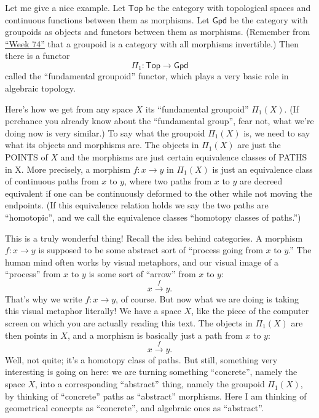 \documentclass{article}
\begin{document}
Let me give a nice example. Let \(\mathsf{Top}\) be the category with
topological spaces and continuous functions between them as morphisms.
Let \(\mathsf{Gpd}\) be the category with groupoids as objects and
functors between them as morphisms. (Remember from
\protect\hyperlink{week74}{``Week 74''} that a groupoid is a category
with all morphisms invertible.) Then there is a functor
\[\Pi_1\colon\mathsf{Top}\to\mathsf{Gpd}\] called the ``fundamental
groupoid'' functor, which plays a very basic role in algebraic topology.

Here's how we get from any space \(X\) its ``fundamental groupoid''
\(\Pi_1(X)\). (If perchance you already know about the ``fundamental
group'', fear not, what we're doing now is very similar.) To say what
the groupoid \(\Pi_1(X)\) is, we need to say what its objects and
morphisms are. The objects in \(\Pi_1(X)\) are just the POINTS of \(X\)
and the morphisms are just certain equivalence classes of PATHS in X.
More precisely, a morphism \(f\colon x\to y\) in \(\Pi_1(X)\) is just an
equivalence class of continuous paths from \(x\) to \(y\), where two
paths from \(x\) to \(y\) are decreed equivalent if one can be
continuously deformed to the other while not moving the endpoints. (If
this equivalence relation holds we say the two paths are ``homotopic'',
and we call the equivalence classes ``homotopy classes of paths.'')

This is a truly wonderful thing! Recall the idea behind categories. A
morphism \(f\colon x\to y\) is supposed to be some abstract sort of
``process going from \(x\) to \(y\).'' The human mind often works by
visual metaphors, and our visual image of a ``process'' from \(x\) to
\(y\) is some sort of ``arrow'' from \(x\) to \(y\):
\[x\xrightarrow{f}y.\] That's why we write \(f\colon x\to y\), of
course. But now what we are doing is taking this visual metaphor
literally! We have a space \(X\), like the piece of the computer screen
on which you are actually reading this text. The objects in \(\Pi_1(X)\)
are then points in \(X\), and a morphism is basically just a path from
\(x\) to \(y\): \[x\xrightarrow{f}y.\] Well, not quite; it's a homotopy
class of paths. But still, something very interesting is going on here:
we are turning something ``concrete'', namely the space \(X\), into a
corresponding ``abstract'' thing, namely the groupoid \(\Pi_1(X)\), by
thinking of ``concrete'' paths as ``abstract'' morphisms. Here I am
thinking of geometrical concepts as ``concrete'', and algebraic ones as
``abstract''.
\end{document}
